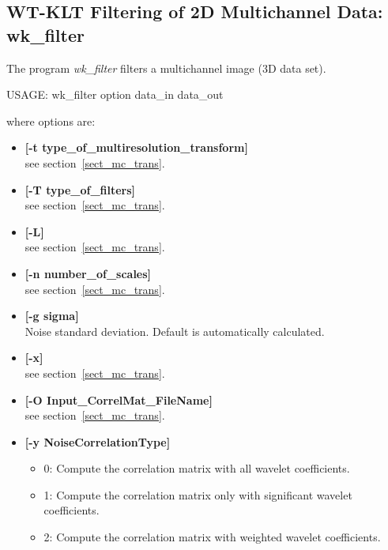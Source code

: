 \subsection{WT-KLT Filtering of 2D Multichannel Data: wk\_filter}
\label{sect_mc_filter}
The program 
{\em wk\_filter} filters 
a multichannel image (3D data set).
{\bf
\begin{center}
 USAGE: wk\_filter option data\_in data\_out
\end{center}}
where options are: 
\begin{itemize} 
\baselineskip=0.4truecm
\itemsep=0.1truecm
\item {\bf [-t type\_of\_multiresolution\_transform]} \\
see section~\ref{sect_mc_trans}.  
\item {\bf [-T type\_of\_filters]}  \\ 
see section~\ref{sect_mc_trans}.
\item {\bf [-L]} \\
see section~\ref{sect_mc_trans}.
\item {\bf [-n number\_of\_scales]} \\
see section~\ref{sect_mc_trans}.  
\item {\bf [-g sigma]}\\
Noise standard deviation. Default is automatically calculated.
\item {\bf [-x]} \\
see section~\ref{sect_mc_trans}.  
\item {\bf [-O Input\_CorrelMat\_FileName]} \\
see section~\ref{sect_mc_trans}.  
\item {\bf [-y NoiseCorrelationType]}
{\small
\begin{itemize}             
\baselineskip=0.4truecm
\itemsep=0.1truecm
\item{0:} Compute the correlation matrix with all wavelet coefficients. 
\item{1:} Compute the correlation matrix only with significant wavelet coefficients. 
\item{2:} Compute the correlation matrix with weighted wavelet coefficients. 
\end{itemize}
}
\end{itemize}
